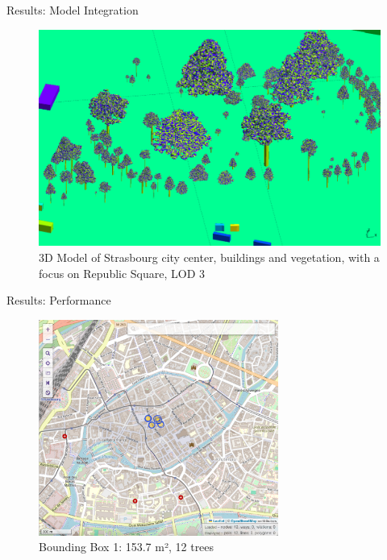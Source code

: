 \documentclass[10pt]{beamer}
\begin{document}
\begin{frame}{Results: Model Integration}
	\begin{figure}
		\centering
		\includegraphics[width=\textwidth]{images/integration_republic_lod3.png}
		\caption{3D Model of Strasbourg city center, buildings and vegetation, with a focus on Republic Square, LOD 3}
		\label{fig:figure1}
	\end{figure}
\end{frame}


\begin{frame}{Results: Performance}
	\Large
	\begin{figure}[H]
	  \centering
	  \includegraphics[width=0.7\textwidth]{images/ovt-bbox1.png}
	  \caption{Bounding Box 1: 153.7 m², 12 trees}
  \end{figure}
  \end{frame}
\end{document}
